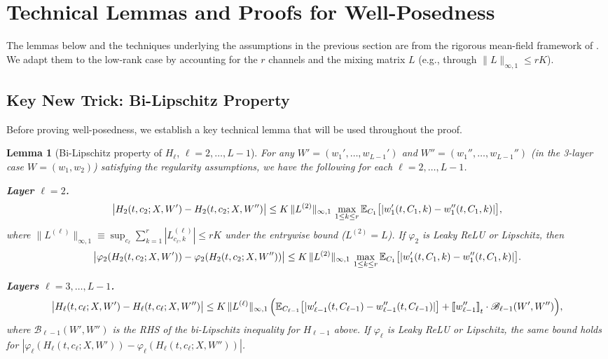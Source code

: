 \documentclass[nohyperref]{article}
\theoremstyle{plain}
\newtheorem{lemma}[theorem]{Lemma}
\theoremstyle{definition}
\theoremstyle{remark}
\begin{document}
\section{Technical Lemmas and Proofs for Well-Posedness}
\label{app:wellposed-proof}

The lemmas below and the techniques underlying the assumptions in the previous section are from the rigorous mean-field framework of \cite{nguyen2023rigorousframeworkmeanfield}. We adapt them to the low-rank case by accounting for the $r$ channels and the mixing matrix $L$ (e.g., through $\|L\|_{\infty,1}\le rK$).

\subsection{Key New Trick: Bi-Lipschitz Property}
\label{app:bilipschitz}

Before proving well-posedness, we establish a key technical lemma that will be used throughout the proof.

\begin{lemma}[Bi-Lipschitz property of $H_\ell$, $\ell=2,\ldots,L-1$]
\label{lem:bilipschitz-H2}
For any $W'=(w_1',\ldots,w_{L-1}')$ and $W''=(w_1'',\ldots,w_{L-1}'')$ (in the 3-layer case $W=(w_1,w_2)$) satisfying the regularity assumptions, we have the following for each $\ell=2,\ldots,L-1$.

\textbf{Layer $\ell=2$.}
\[
\big|H_2(t,c_2;X,W')-H_2(t,c_2;X,W'')\big| \le K\,\|L^{(2)}\|_{\infty,1}\,\max_{1\le k\le r}\mathbb{E}_{C_1}\big[|w_1'(t,C_1,k)-w_1''(t,C_1,k)|\big],
\]
where $\|L^{(\ell)}\|_{\infty,1}\equiv \sup_{c_\ell}\sum_{k=1}^r |L^{(\ell)}_{c_\ell,k}|\le rK$ under the entrywise bound ($L^{(2)}=L$). If $\varphi_2$ is Leaky ReLU or Lipschitz, then
\[
\big|\varphi_2(H_2(t,c_2;X,W'))-\varphi_2(H_2(t,c_2;X,W''))\big| \le K\,\|L^{(2)}\|_{\infty,1}\,\max_{1\le k\le r}\mathbb{E}_{C_1}\big[|w_1'(t,C_1,k)-w_1''(t,C_1,k)|\big].
\]

\textbf{Layers $\ell=3,\ldots,L-1$.}
\[
\big|H_\ell(t,c_\ell;X,W')-H_\ell(t,c_\ell;X,W'')\big| \le K\,\|L^{(\ell)}\|_{\infty,1}\,
\Big( \mathbb{E}_{C_{\ell-1}}\big[|w_{\ell-1}'(t,C_{\ell-1})-w_{\ell-1}''(t,C_{\ell-1})|\big]
+ {[\![ w_{\ell-1}'' ]\!]}_t \cdot \mathscr{B}_{\ell-1}(W',W'')\Big),
\]
where $\mathscr{B}_{\ell-1}(W',W'')$ is the RHS of the bi-Lipschitz inequality for $H_{\ell-1}$ above. If $\varphi_\ell$ is Leaky ReLU or Lipschitz, the same bound holds for $|\varphi_\ell(H_\ell(t,c_\ell;X,W'))-\varphi_\ell(H_\ell(t,c_\ell;X,W''))|$.
\end{lemma}
\end{document}
